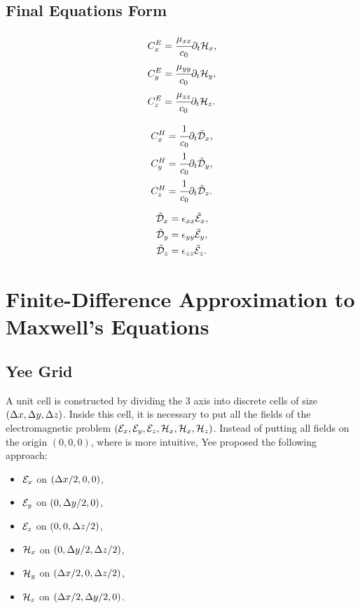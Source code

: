 \subsection{Final Equations Form}

\begin{align}
    C_x^E &= \cfrac{\mu_{xx}}{c_0} \partial_t \mathcal{H}_x, \\
    C_y^E &= \cfrac{\mu_{yy}}{c_0} \partial_t \mathcal{H}_y,\\
    C_z^E &= \cfrac{\mu_{zz}}{c_0} \partial_t \mathcal{H}_z.
\end{align}

\begin{align}
    C_x^H &= \cfrac{1}{c_0} \partial_t \tilde{\mathcal{D}}_x, \\
    C_y^H &= \cfrac{1}{c_0} \partial_t \tilde{\mathcal{D}}_y, \\
    C_z^H &= \cfrac{1}{c_0} \partial_t \tilde{\mathcal{D}}_z.
\end{align}

\begin{align}
    \tilde{\mathcal{D}}_x &= \epsilon_{xx} \tilde{\mathcal{E}}_x, \label{eq:dnx_update} \\
    \tilde{\mathcal{D}}_y &= \epsilon_{yy} \tilde{\mathcal{E}}_y, \label{eq:dny_update} \\
    \tilde{\mathcal{D}}_z &= \epsilon_{zz} \tilde{\mathcal{E}}_z. \label{eq:dnz_update}
\end{align}


\section{Finite-Difference Approximation to Maxwell's Equations}

\subsection{Yee Grid}
A unit cell is constructed by dividing the 3 axis into discrete cells of size $(\Delta x, \Delta y, \Delta z)$. Inside this cell, it is necessary to put all the fields of the electromagnetic problem $(\mathcal{E}_x, \mathcal{E}_y, \mathcal{E}_z, \mathcal{H}_x, \mathcal{H}_x, \mathcal{H}_z)$. Instead of putting all fields on the origin $(0, 0, 0)$, where is more intuitive, Yee proposed the following approach:



\begin{itemize}
    \item $\mathcal{E}_x$ on $(\Delta x/2, 0, 0)$,
    \item $\mathcal{E}_y$ on $(0, \Delta y/2, 0)$,
    \item $\mathcal{E}_z$ on $(0, 0, \Delta z/2)$,
    \item $\mathcal{H}_x$ on $(0, \Delta y/2, \Delta z/2)$,
    \item $\mathcal{H}_y$ on $(\Delta x/2, 0, \Delta z/2)$,
    \item $\mathcal{H}_z$ on $(\Delta x/2, \Delta y/2, 0)$.
\end{itemize}

